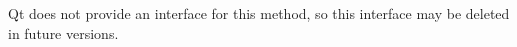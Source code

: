 
\begin{DoxyRefList}
\item[Member \mbox{\hyperlink{classlancet_1_1_i_scxm_state_machine_handler_a313c921e148c767db24bd23e5a60b6f5}{lancet\+::IScxm\+State\+Machine\+Handler\+::Is\+Dispatchable\+Target}} (const QString \&sessionid)]\label{deprecated__deprecated000001}%
%
 Qt does not provide an interface for this method, so this interface may be deleted in future versions.
\end{DoxyRefList}